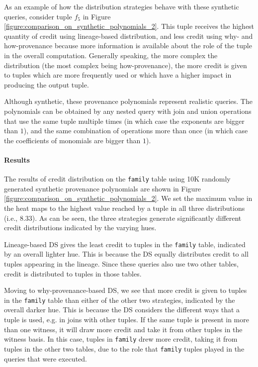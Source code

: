 As an example of how the distribution strategies behave with these synthetic queries, consider tuple $f_5$ in Figure \ref{figure:comparison_on_synthetic_polynomials_2}.
This tuple receives the highest quantity of credit using lineage-based distribution, and less credit using why- and how-provenance because more information is available about the role of the tuple in the overall computation. 
Generally speaking, the more complex the distribution (the most complex being how-provenance), the more credit is given to tuples which are more frequently used or which have a higher impact in producing the output tuple. 

Although synthetic, these provenance polynomials represent realistic queries.  The polynomials can be obtained by any nested query with join and union operations that use the same tuple multiple times (in which case the exponents are bigger than $1$), and the same combination of operations more than once (in which case the coefficients of monomials are bigger than $1$). 

\paragraph{Results} The results of credit distribution on the \texttt{family} table using 10K randomly generated synthetic provenance polynomials are shown in
Figure \ref{figure:comparison_on_synthetic_polynomials_2}. 
We set the maximum value in the heat maps to the highest value reached by a tuple in all three distributions (i.e., $8.33$). 
As can be seen, the three strategies generate significantly different credit distributions indicated by the varying hues.  

Lineage-based DS gives the least credit to tuples in the \texttt{family} table, indicated by an overall lighter hue. This is because the DS equally distributes credit to all tuples appearing in the lineage. Since these queries also use two other tables, credit is distributed to tuples in those tables.

Moving to %
why-provenance-based DS, we see that more credit is given to tuples in the \texttt{family} table than either of the other two strategies, indicated by the overall darker hue. This is because the DS considers the different ways that a tuple is used, e.g. in joins with other tuples. If the same tuple is present in more than one witness, it will draw more credit and take it from  other tuples in the witness basis. In this case, tuples in \texttt{family} drew more credit, taking it from tuples in the other two tables, due to the role that \texttt{family}  tuples played in the queries that were executed.

